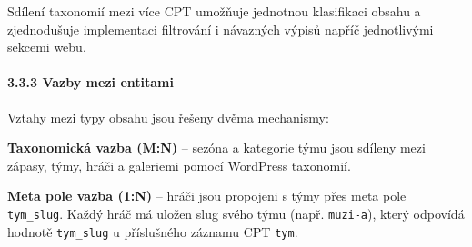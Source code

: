 \begin{Shaded}
\begin{Highlighting}[]
\OtherTok{,} \NormalTok{(}\OtherTok{,} \OtherTok{,} \OtherTok{,} \NormalTok{)}\OtherTok{,} \NormalTok{(}
    \NormalTok{            =\textgreater{} }\NormalTok{(}
        \NormalTok{          =\textgreater{} }\OtherTok{,}
        \NormalTok{ =\textgreater{} }\OtherTok{,}
\NormalTok{    )}\OtherTok{,}
    \NormalTok{      =\textgreater{} }\OtherTok{,}
    \NormalTok{            =\textgreater{} }\OtherTok{,}
    \NormalTok{ =\textgreater{} }\OtherTok{,}
    \NormalTok{      =\textgreater{} }\OtherTok{,}
\NormalTok{))}\OtherTok{;}
\end{Highlighting}
\end{Shaded}

Sdílení taxonomií mezi více CPT umožňuje jednotnou klasifikaci obsahu a
zjednodušuje implementaci filtrování i návazných výpisů napříč
jednotlivými sekcemi webu.

\paragraph{3.3.3 Vazby mezi entitami}\label{vazby-mezi-entitami}

Vztahy mezi typy obsahu jsou řešeny dvěma mechanismy:

\textbf{Taxonomická vazba (M:N)} -- sezóna a kategorie týmu jsou sdíleny
mezi zápasy, týmy, hráči a galeriemi pomocí WordPress taxonomií.

\textbf{Meta pole vazba (1:N)} -- hráči jsou propojeni s týmy přes meta
pole \texttt{tym\_slug}. Každý hráč má uložen slug svého týmu (např.
\texttt{muzi-a}), který odpovídá hodnotě \texttt{tym\_slug} u
příslušného záznamu CPT \texttt{tym}.

